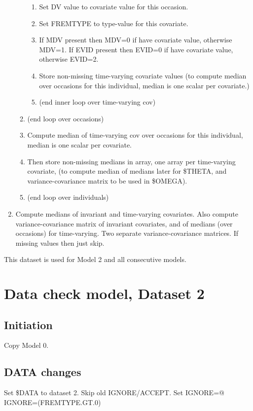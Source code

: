 \begin{enumerate}
\begin{enumerate}
\begin{enumerate}
    \item Set DV value to covariate value for this occasion. 
    \item Set FREMTYPE to type-value for this covariate. 
    \item If MDV present then MDV=0 if have covariate value, otherwise MDV=1. 
    If EVID present then EVID=0 if have covariate value, otherwise EVID=2. 
    \item Store non-missing time-varying covariate values (to compute median over occasions for this individual, 
    median is one scalar per covariate.) 
    \item[] (end inner loop over time-varying cov)
\end{enumerate}
\item[] (end loop over occasions)
\item Compute median of time-varying cov over occasions for this individual, median is one scalar per covariate.
\item Then store non-missing medians in array, one array per time-varying covariate, (to compute 
median of medians later for \$THETA, and variance-covariance matrix  to be used in \$OMEGA).
\item[] (end loop over individuals)
\end{enumerate}

	\item Compute medians of invariant and time-varying covariates. Also compute variance-covariance matrix of invariant covariates, and of medians (over occasions) for time-varying. Two separate variance-covariance matrices. If missing values then just skip.
\end{enumerate}

This dataset is used for Model 2 and all consecutive models.

\section{Data check model, Dataset 2}
\subsection{Initiation}
Copy Model 0.

\subsection{DATA changes}
Set \$DATA to dataset 2. Skip old IGNORE/ACCEPT. Set IGNORE=@ IGNORE=(FREMTYPE.GT.0)

